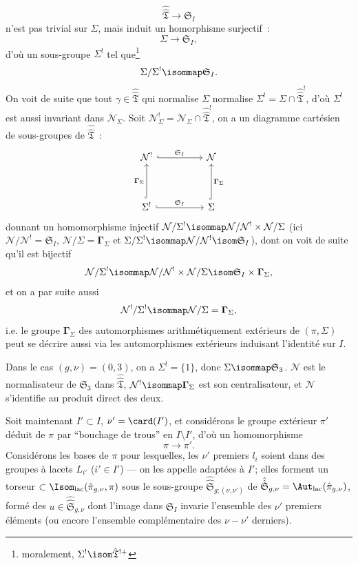 $$
\hat{\hat{\mathfrak{T}}}\to \mathfrak{S}_I
$$
n'est pas trivial sur $\Sigma$, mais induit un homorphisme surjectif~:
$$
\Sigma\to \mathfrak{S}_I,
$$
d'où un sous-groupe $\Sigma^!$ tel que\footnote{moralement, $\Sigma^! \isom \hat{\mathfrak{T}}^{!+}$}
$$
\Sigma/\Sigma^!\isommap \mathfrak{S}_I.
$$
On voit de suite que tout $\gamma\in\hat{\hat{\mathfrak{T}}}$ qui normalise $\Sigma$ normalise $\Sigma^!=\Sigma\cap\hat{\hat{\mathfrak{T}}}^!$, d'où $\Sigma^!$ est aussi invariant dans $\mathcal{N}_\Sigma$. Soit $\mathcal{N}_\Sigma^!=\mathcal{N}_\Sigma\cap\hat{\hat{\mathfrak{T}}}^!$, on a un diagramme cartésien de sous-groupes de $\hat{\hat{\mathfrak{T}}}$~:
\[\begin{tikzcd}
	{\mathcal{N}^!} && \mathcal{N} \\
	\\
	{\Sigma^!} && \Sigma
	\arrow["{\boldsymbol{\Gamma}_\Sigma}", hook, from=3-1, to=1-1]
	\arrow["{\mathfrak{S}_I}", hook, from=1-1, to=1-3]
	\arrow["{\mathfrak{S}_I}", hook, from=3-1, to=3-3]
	\arrow["{\boldsymbol{\Gamma}_\Sigma}"', hook, from=3-3, to=1-3]
\end{tikzcd}\]
donnant un homomorphisme injectif $\mathcal{N}/\Sigma^!\isommap \mathcal{N}/\mathcal{N}^!\times\mathcal{N}/\Sigma$ (ici $\mathcal{N}/\mathcal{N}^!=\mathfrak{S}_I$, $\mathcal{N}/\Sigma=\boldsymbol{\Gamma}_\Sigma$ et $\Sigma/\Sigma^! \isommap \mathcal{N}/\mathcal{N}^! \isom \mathfrak{S}_I$), dont on voit de suite qu'il est bijectif
$$
\mathcal{N}/\Sigma^! \isommap \mathcal{N}/\mathcal{N}^!\times\mathcal{N}/\Sigma \isom 
\mathfrak{S}_I\times\boldsymbol{\Gamma}_\Sigma,
$$
et on a par suite aussi
$$
\mathcal{N}^!/\Sigma^! \isommap \mathcal{N}/\Sigma=\boldsymbol{\Gamma}_\Sigma,
$$
i.e. le groupe $\boldsymbol{\Gamma}_\Sigma$ des automorphismes arithmétiquement extérieurs de $(\pi,\Sigma)$ peut se décrire aussi via les automorphismes extérieurs induisant l'identité sur $I$.

Dans le cas $(g,\nu)=(0,3)$, on a $\Sigma^!=\{1\}$, donc $\Sigma \isommap \mathfrak{S}_3$.  $\mathcal{N}$ est le normalisateur de $\mathfrak{S}_3$ dans $\hat{\hat{\mathfrak{T}}}$, $\mathcal{N}^! \isommap \boldsymbol{\Gamma}_\Sigma$ est son centralisateur, et $\mathcal{N}$ s'identifie au produit direct des deux.

Soit maintenant $I'\subset  I$, $\nu'={\card}(I')$, et considérons le groupe extérieur $\pi'$ déduit de $\pi$ par ``bouchage de trous'' en $I\setminus I'$, d'où un homomorphisme
$$
\pi\to \pi'.
$$
Considérons les bases de $\pi$ pour lesquelles, les $\nu'$ premiers $l_i$ soient dans des groupes à lacets $L_{i'}$ ($i'\in I'$) --- on les appelle adaptées à $I'$; elles forment un torseur $\subset {\Isom}_{\operatorname{lac}}(\hat{\pi}_{g,\nu},\pi)$ sous le sous-groupe $\hat{\hat{\mathfrak{S}}}_{g;(\nu,\nu')}$ de $\hat{\hat{\mathfrak{S}}}_{g,\nu}={\Aut}_{\operatorname{lac}} (\hat{\pi}_{g,\nu})$, formé des $u\in\hat{\hat{\mathfrak{S}}}_{g,\nu}$ dont l'image dans $\mathfrak{S}_I$ invarie l'ensemble des $\nu'$ premiers éléments (ou encore l'ensemble complémentaire des $\nu-\nu'$ derniers).

